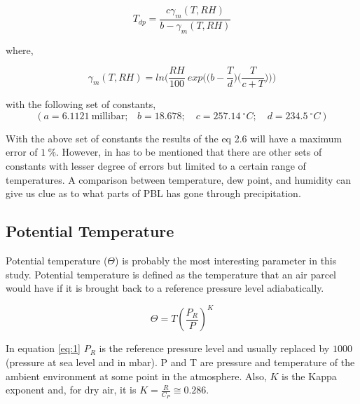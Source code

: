 \documentclass[a4paper,12pt]{article}
\numberwithin{equation}{section} %
\begin{document}
\vspace{0.25cm}
\begin{equation}
T_{dp} = \frac{c\gamma_m(T,RH)}{b - \gamma_m (T,RH)}
\end{equation}

where,

\begin{equation}
\gamma_m(T,RH) = ln\Bigg(\frac{RH}{100}\: exp\Big(\Big(b - \frac{T}{d}\Big)\Big(\frac{T}{c+T}\Big)\Big)\Bigg)
\end{equation}

\vspace{0.25cm}

with the following set of constants,
\begin{equation*}
(a = 6.1121\: \text{millibar;} \quad b = 18.678; \quad c = 257.14 \:^\circ C; \quad d = 234.5 \: ^\circ C)
\end{equation*}

\vspace{0.25cm}

With the above set of constants the results of the eq 2.6 will have a maximum error of $1\: \%$. However, in has to be mentioned that there are other sets of constants with lesser degree of errors but limited to a certain range of temperatures. A comparison between temperature, dew point, and humidity can give us clue as to what parts of PBL has gone through precipitation.


\subsection{Potential Temperature}

Potential temperature ($\Theta$) is probably the most interesting parameter in this study. Potential temperature is defined as the temperature that an air parcel would have if it is brought back to a reference pressure level adiabatically.

\vspace{0.5cm}

\begin{equation}\label{eq:1}
\Theta = T(\frac{P_R}{P})^K
\end{equation}

\vspace{0.5cm}

In equation \ref{eq:1} $P_R$ is the reference pressure level and usually replaced by $1000$ (pressure at sea level and in mbar). P and T are pressure and temperature of the ambient environment at some point in the atmosphere. Also, $K$ is the Kappa exponent and, for dry air, it is $K = \frac{R}{C_P}\cong 0.286$.
\end{document}
